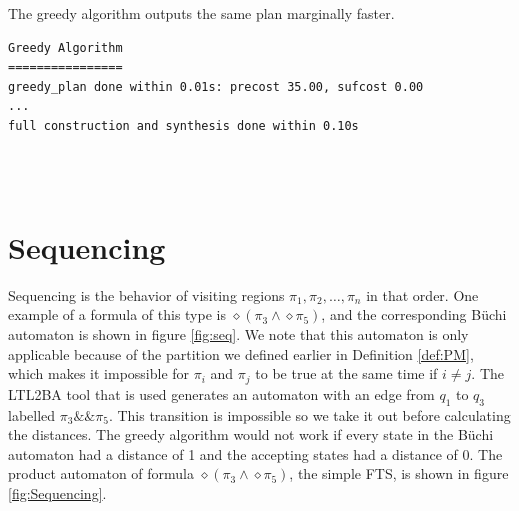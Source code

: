The greedy algorithm outputs the same plan marginally faster. \\


\begin{minipage}{\textwidth}
\begingroup
\fontsize{9pt}{12pt}\selectfont
\begin{lstlisting}
Greedy Algorithm
================
greedy_plan done within 0.01s: precost 35.00, sufcost 0.00
...
full construction and synthesis done within 0.10s 
\end{lstlisting}
\endgroup
\end{minipage} \\ \\


\section{Sequencing}
Sequencing is the behavior of visiting regions $\pi_1,\pi_2,\dots,\pi_n$ in that order. One example of a formula of this type is $\diamond (\pi_3 \land  \diamond \pi_5)$, and the corresponding B\"uchi automaton is shown in figure \ref{fig:seq}. We note that this automaton is only applicable because of the partition we defined earlier in Definition \ref{def:PM}, which makes it impossible for $\pi_i$ and $\pi_j$ to be true at the same time if $i\neq j$. The LTL2BA tool \cite{ltlbuchiwebsite} that is used generates an automaton with an edge from $q_1$ to $q_3$ labelled $\pi_3 \&\& \pi_5 $. This transition is impossible so we take it out before calculating the distances. The greedy algorithm would not work if every state in the B\"uchi automaton had a distance of 1 and the accepting states had a distance of 0. The product automaton of formula $\diamond (\pi_3 \wedge \diamond \pi_5)$, the simple FTS, is shown in figure \ref{fig:Sequencing}.


